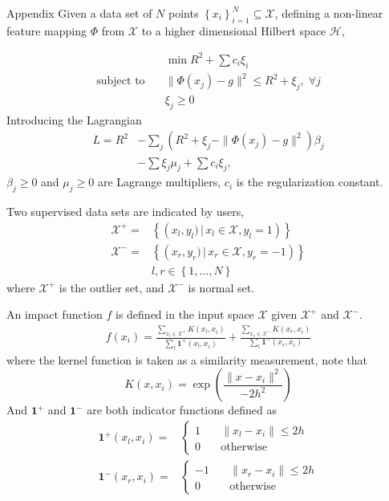 \begin{frame}{Appendix}
Given a data set of $N$ points $\left\lbrace x_i \right\rbrace_{i=1}^N \subseteq \mathcal{X}$, 
defining a non-linear feature mapping $\Phi$ from $\mathcal{X}$ to a higher dimensional Hilbert space $\mathcal{H}$,

\begin{align}
\label{eq:svc1}
&\min R^2 + \sum c_i\xi_i\\		
\text{subject to}\quad &  \| \Phi(x_j) - g\|^2 \leq R^2 + \xi_j,\; \forall j \nonumber \\
& \xi_j \geq 0 \nonumber
\end{align} 
Introducing the Lagrangian
\begin{align}
\label{eq:svc2}
L=R^2&-\sum_j\left(R^2+\xi_j-\|\Phi(x_j)-g\|^2\right)\beta_j\nonumber\\
     &-\sum\xi_j\mu_j+\sum c_i\xi_j,
\end{align}
$\beta_j\geq 0$ and $\mu_j\geq 0$ are Lagrange multipliers, $c_i$ is the regularization constant.
\end{frame}
\begin{frame}
Two supervised data sets are indicated by users, 
\begin{align*}
\mathcal{X^+}=&\left\lbrace \left( x_l, y_l) \,|\,  x_l \in \mathcal{X}, y_l=1 \right)\right\rbrace\\
\mathcal{X^-}=&\left\lbrace \left( x_r, y_r) \,|\, x_r \in \mathcal{X}, y_r=-1\right)\right\rbrace\\
&l, r \in \left\lbrace 1,\ldots ,N\right\rbrace
\end{align*}
where $\mathcal{X^+}$ is the outlier set, and $\mathcal{X^-}$ is normal set.
\end{frame}
\begin{frame}
An impact function $f$ is defined in the input space $\mathcal{X}$ given $\mathcal{X^+}$ and $\mathcal{X^-}$.  
\begin{gather}
f\left(x_i\right) = \frac{\sum_{x_l\in \mathcal{X^+}}K\left(x_l, x_i\right)}{\sum_l\mathbf{1^+}\left(x_l,x_i\right)} + 
\frac{\sum_{x_r\in \mathcal{X^-}}K\left(x_r, x_i\right)}{\sum_l\mathbf{1^-}\left(x_r,x_i\right)}
\end{gather}
where the kernel function is taken as a similarity measurement, note that
\[
K(x, x_i) = \exp\left(\frac{\| x - x_i \|^2}{-2h^2}\right)
\]
And $\mathbf{1^+}$ and $\mathbf{1^-}$ are both indicator functions defined as
\begin{align*}
\mathbf{1^+}(x_l, x_i)= &
     \begin{cases}
     	1 & \quad \| x_l - x_i \| \leq 2h\\
     	0 & \quad \text{otherwise}
     \end{cases}\\
\mathbf{1^-}(x_r, x_i)=&
     \begin{cases}
     	-1 & \quad \| x_r - x_i \| \leq 2h\\
     	0 & \quad \text{otherwise}
     \end{cases}     
\end{align*}
\end{frame}
